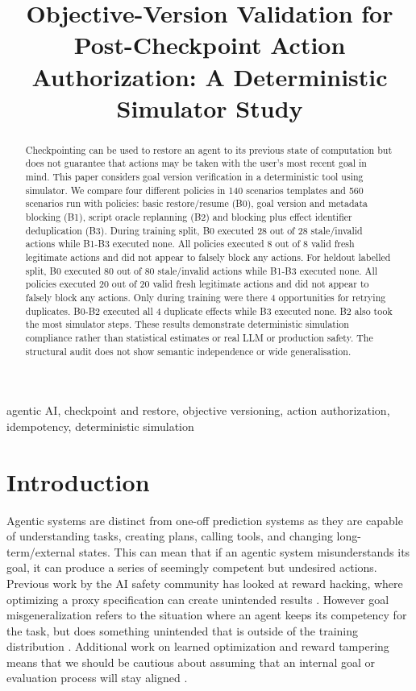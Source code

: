 \documentclass[conference]{IEEEtran}
\title{Objective-Version Validation for Post-Checkpoint Action Authorization: A Deterministic Simulator Study}
\author{\IEEEauthorblockN{Km Shweta}
\IEEEauthorblockA{Department of Information Technology\\
Indian Institute of Information Technology Allahabad\\
Prayagraj, India\\
Email: mcl2026007@iiita.ac.in}}
\begin{document}
\maketitle

\begin{abstract}
Checkpointing can be used to restore an agent to its previous state of computation but does not guarantee that actions may be taken with the user’s most recent goal in mind. This paper considers goal version verification in a deterministic tool using simulator. We compare four different policies in 140 scenarios templates and 560 scenarios run with policies: basic restore/resume (B0), goal version and metadata blocking (B1), script oracle replanning (B2) and blocking plus effect identifier deduplication (B3). During training split, B0 executed 28 out of 28 stale/invalid actions while B1-B3 executed none. All policies executed 8 out of 8 valid fresh legitimate actions and did not appear to falsely block any actions. For heldout labelled split, B0 executed 80 out of 80 stale/invalid actions while B1-B3 executed none. All policies executed 20 out of 20 valid fresh legitimate actions and did not appear to falsely block any actions. Only during training were there 4 opportunities for retrying duplicates. B0-B2 executed all 4 duplicate effects while B3 executed none. B2 also took the most simulator steps. These results demonstrate deterministic simulation compliance rather than statistical estimates or real LLM or production safety. The structural audit does not show semantic independence or wide generalisation. \end{abstract}

\begin{IEEEkeywords}
agentic AI, checkpoint and restore, objective versioning, action authorization, idempotency, deterministic simulation
\end{IEEEkeywords}

\section{Introduction}
Agentic systems are distinct from one-off prediction systems as they are capable of understanding tasks, creating plans, calling tools, and changing long-term/external states. This can mean that if an agentic system misunderstands its goal, it can produce a series of seemingly competent but undesired actions. Previous work by the AI safety community has looked at reward hacking, where optimizing a proxy specification can create unintended results \cite{amodei2016,skalse2022}. However goal misgeneralization refers to the situation where an agent keeps its competency for the task, but does something unintended that is outside of the training distribution \cite{langosco2022}. Additional work on learned optimization and reward tampering means that we should be cautious about assuming that an internal goal or evaluation process will stay aligned \cite{hubinger2019,denison2024}.
\end{document}
